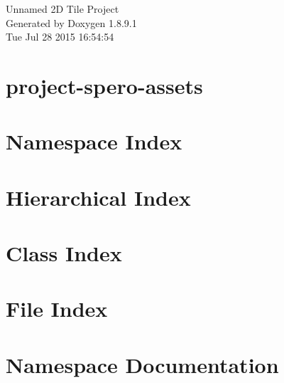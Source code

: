 \documentclass[twoside]{book}
\newcommand{\+}{\discretionary{\mbox{\scriptsize$\hookleftarrow$}}{}{}}
\newcommand{\clearemptydoublepage}{%
  \newpage{\pagestyle{empty}\cleardoublepage}%
}
\begin{document}
\hypersetup{pageanchor=false,
             bookmarks=true,
             bookmarksnumbered=true,
             pdfencoding=unicode
            }
\begin{titlepage}
\vspace*{7cm}
\begin{center}%
{\Large Unnamed 2\+D Tile Project }\\
\vspace*{1cm}
{\large Generated by Doxygen 1.8.9.1}\\
\vspace*{0.5cm}
{\small Tue Jul 28 2015 16:54:54}\\
\end{center}
\end{titlepage}
\clearemptydoublepage
\tableofcontents
\clearemptydoublepage
{}
\hypersetup{pageanchor=true}

\chapter{project-\/spero-\/assets}
\label{md_project-spero-assets__r_e_a_d_m_e}
\hypertarget{md_project-spero-assets__r_e_a_d_m_e}{}

\chapter{Namespace Index}

\chapter{Hierarchical Index}

\chapter{Class Index}

\chapter{File Index}

\chapter{Namespace Documentation}


\end{document}
